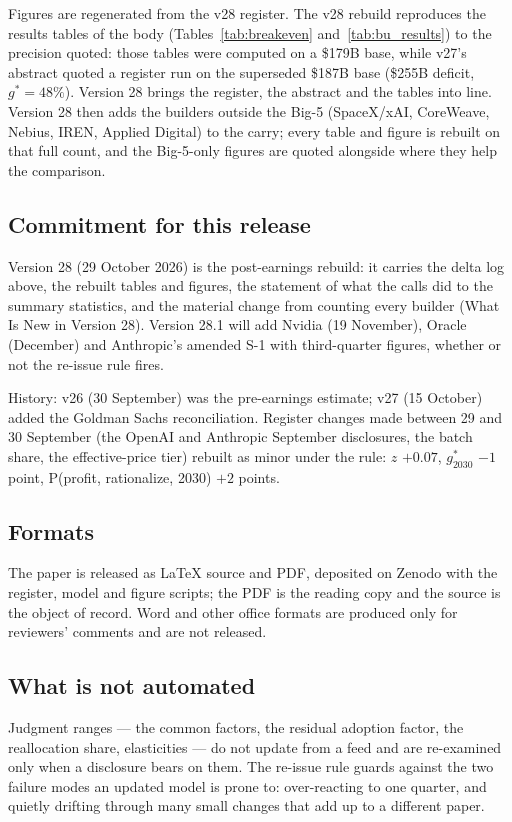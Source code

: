 \documentclass[11pt,letterpaper]{article}
\begin{document}
Figures are regenerated from the v28 register. The v28 rebuild reproduces the results tables of the body (Tables~\ref{tab:breakeven} and~\ref{tab:bu_results}) to the precision quoted: those tables were computed on a \$179B base, while v27's abstract quoted a register run on the superseded \$187B base (\$255B deficit, $g^{*}=48\%$). Version 28 brings the register, the abstract and the tables into line. Version 28 then adds the builders outside the Big-5 (SpaceX/xAI, CoreWeave, Nebius, IREN, Applied Digital) to the carry; every table and figure is rebuilt on that full count, and the Big-5-only figures are quoted alongside where they help the comparison.

\subsection*{Commitment for this release}
Version 28 (29 October 2026) is the post-earnings rebuild: it carries the delta log above, the rebuilt tables and figures, the statement of what the calls did to the summary statistics, and the material change from counting every builder (What Is New in Version 28). Version 28.1 will add Nvidia (19 November), Oracle (December) and Anthropic's amended S-1 with third-quarter figures, whether or not the re-issue rule fires.

History: v26 (30 September) was the pre-earnings estimate; v27 (15 October) added the Goldman Sachs reconciliation. Register changes made between 29 and 30 September (the OpenAI and Anthropic September disclosures, the batch share, the effective-price tier) rebuilt as minor under the rule: $z$ $+0.07$, $g^{*}_{2030}$ $-1$ point, P(profit, rationalize, 2030) $+2$ points.

\subsection*{Formats}
The paper is released as LaTeX source and PDF, deposited on Zenodo with the register, model and figure scripts; the PDF is the reading copy and the source is the object of record. Word and other office formats are produced only for reviewers' comments and are not released.

\subsection*{What is not automated}
Judgment ranges --- the common factors, the residual adoption factor, the reallocation share, elasticities --- do not update from a feed and are re-examined only when a disclosure bears on them. The re-issue rule guards against the two failure modes an updated model is prone to: over-reacting to one quarter, and quietly drifting through many small changes that add up to a different paper.
\end{document}
